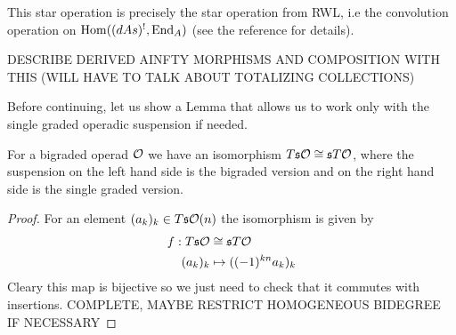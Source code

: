 \documentclass[twoside]{article}
\begin{document}
This star operation is precisely the star operation from RWL, i.e the convolution operation on $\operatorname{Hom}((dAs)^!, \operatorname{End}_A)$ (see the reference for details). 

DESCRIBE DERIVED AINFTY MORPHISMS AND COMPOSITION WITH THIS (WILL HAVE TO TALK ABOUT TOTALIZING COLLECTIONS)

Before continuing, let us show a Lemma that allows us to work only with the single graded operadic suspension if needed.
\begin{lem}
For a bigraded operad ${\mathcal O}$ we have an isomorphism $T\mathfrak{s}{\mathcal O}\cong \mathfrak{s} T{\mathcal O}$, where the suspension on the left hand side is the bigraded version and on the right hand side is the single graded version. 
\end{lem}
\begin{proof}
For an element $(a_k)_k\in T\mathfrak{s}{\mathcal O}(n)$ the isomorphism is given by
\begin{align*}
f:T\mathfrak{s}{\mathcal O}&\cong \mathfrak{s} T{\mathcal O}\\
(a_k)_k&\mapsto ((-1)^{kn}a_k)_k
\end{align*}
Cleary this map is bijective so we just need to check that it commutes with insertions. COMPLETE, MAYBE RESTRICT HOMOGENEOUS BIDEGREE IF NECESSARY
\end{proof}
\end{document}
